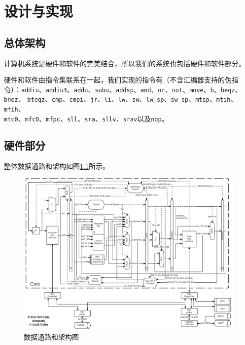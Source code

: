 \documentclass[11pt,utf8]{report}
\begin{document}
\chapter{设计与实现}

\section{总体架构}
	计算机系统是硬件和软件的完美结合，所以我们的系统也包括硬件和软件部分。
	
	硬件和软件由指令集联系在一起，我们实现的指令有（不含汇编器支持的伪指令）：\texttt{addiu}、\texttt{addiu3}、\texttt{addu}、\texttt{subu}、\texttt{addsp}、\texttt{and}、\texttt{or}、\texttt{not}、\texttt{move}、\texttt{b}、\texttt{beqz}、\\\texttt{bnez}、 \texttt{bteqz}、\texttt{cmp}、\texttt{cmpi}、\texttt{jr}、\texttt{li}、\texttt{lw}、\texttt{sw}、\texttt{lw\_sp}、\texttt{sw\_sp}、\texttt{mtsp}、\texttt{mtih}、\texttt{mfih}、\\\texttt{mtc0}、\texttt{mfc0}、\texttt{mfpc}、\texttt{sll}、\texttt{sra}、\texttt{sllv}、\texttt{srav}以及\texttt{nop}。

\section{硬件部分}

	整体数据通路和架构如图\ref{datapath}所示。

	\begin{figure}[h]
		\centering
		\setlength{\leftskip}{-40pt}
		\includegraphics[width=1.2\textwidth]{datapath}
		\caption{数据通路和架构图}
		\label{datapath}
	\end{figure}
\end{document}
